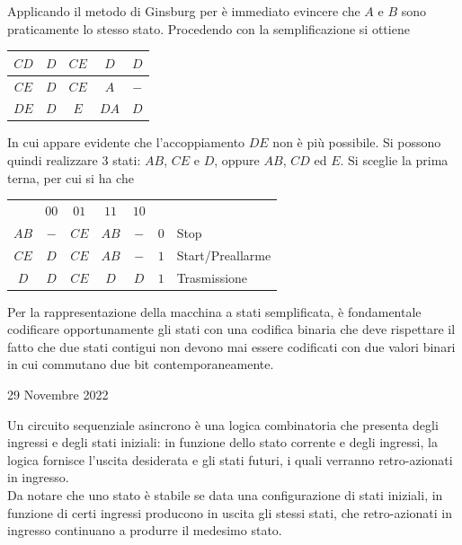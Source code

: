 \documentclass[a4paper]{extarticle}
\renewcommand\arraystretch{}
\begin{document}
\vspace{1em}
\noindent
Applicando il metodo di Ginsburg per è immediato evincere che $A$ e $B$ sono praticamente lo stesso stato. Procedendo con la semplificazione si ottiene

\vspace{1em}
\noindent
\begin{table}[H]
\setlength{\tabcolsep}{4pt}
\renewcommand{\arraystretch}{1.2}
\centering
\begin{tabular}{c|c|c|c|c}
    $CD$ & $D$ & $CE$ & $D$ & $D$\\
    \hline
    $CE$ & $D$ & $CE$ & $A$ & $-$\\
    \hline
    $DE$ & $D$ & $E$ & $DA$ & $D$
\end{tabular}
\end{table}

\noindent
In cui appare evidente che l'accoppiamento $DE$ non è più possibile. Si possono quindi realizzare $3$ stati: $AB$, $CE$ e $D$, oppure $AB$, $CD$ ed $E$. Si sceglie la prima terna, per cui si ha che

\vspace{1em}
\noindent
\begin{table}[H]
\setlength{\tabcolsep}{4pt}
\renewcommand{\arraystretch}{1.2}
\centering
\begin{tabular}{c|c|c|c|c|cl}
         & $00$ & $01$ & $11$ & $10$\\
    $AB$ & $-$  & $CE$ & $AB$ & $-$ & $0$ & Stop\\
    \hline
    $CE$ & $D$  & $CE$ & $AB$ & $-$ & $1$ & Start/Preallarme\\
    \hline
    $D$  & $D$  & $CE$ & $D$ & $D$ & $1$ & Trasmissione
\end{tabular}
\end{table}

\vspace{1em}
\noindent
Per la rappresentazione della macchina a stati semplificata, è fondamentale codificare opportunamente gli stati con una codifica binaria che deve rispettare il fatto che due stati contigui non devono mai essere codificati con due valori binari in cui commutano due bit contemporaneamente.

\newpage
\begin{center}
    29 Novembre 2022
\end{center}
Un circuito sequenziale asincrono è una logica combinatoria che presenta degli ingressi e degli stati iniziali: in funzione dello stato corrente e degli ingressi, la logica fornisce l'uscita desiderata e gli stati futuri, i quali verranno retro-azionati in ingresso.\\
Da notare che uno stato è stabile se data una configurazione di stati iniziali, in funzione di certi ingressi producono in uscita gli stessi stati, che retro-azionati in ingresso continuano a produrre il medesimo stato.
\end{document}
